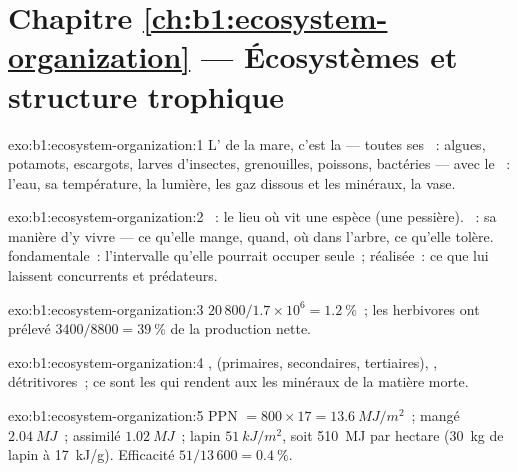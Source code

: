 \section*{Chapitre \ref{ch:b1:ecosystem-organization} --- Écosystèmes et structure trophique}

\begin{solution}{exo:b1:ecosystem-organization:1}
L' de la mare, c'est la  --- toutes ses ~:
algues, potamots, escargots, larves d'insectes, grenouilles, poissons,
bactéries --- avec le ~: l'eau, sa température, la lumière, les
gaz dissous et les minéraux, la vase.
\end{solution}

\begin{solution}{exo:b1:ecosystem-organization:2}
~: le lieu où vit une espèce (une pessière). ~: sa manière
d'y vivre --- ce qu'elle mange, quand, où dans l'arbre, ce qu'elle
tolère.  fondamentale~: l'intervalle qu'elle pourrait occuper
seule~; réalisée~: ce que lui laissent concurrents et prédateurs.
\end{solution}

\begin{solution}{exo:b1:ecosystem-organization:3}
$20\,800/1.7\times 10^6 = \qty{1.2}{\%}$~; les herbivores ont prélevé
$3400/8800 = \qty{39}{\%}$ de la production nette.
\end{solution}

\begin{solution}{exo:b1:ecosystem-organization:4}
,  (primaires, secondaires, tertiaires),
, détritivores~; ce sont les  qui rendent aux
 les minéraux de la matière morte.
\end{solution}

\begin{solution}{exo:b1:ecosystem-organization:5}
PPN $= 800\times 17 = \qty{13.6}{MJ/m^2}$~; mangé $\qty{2.04}{MJ}$~;
assimilé $\qty{1.02}{MJ}$~; lapin $\qty{51}{kJ/m^2}$, soit
\qty{510}{MJ} par hectare (\qty{30}{kg} de lapin à \qty{17}{kJ/g}).
Efficacité $51/13\,600 = \qty{0.4}{\%}$.
\end{solution}

